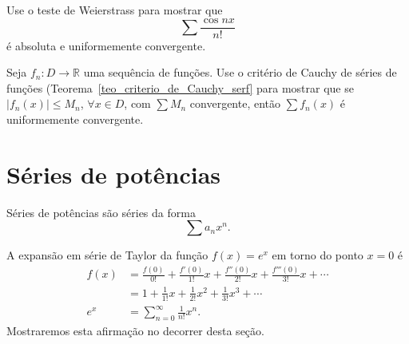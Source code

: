 \begin{exer}
  Use o teste de Weierstrass para mostrar que
  \begin{equation}
    \sum \frac{\cos nx}{n!}
  \end{equation}
é absoluta e uniformemente convergente.
\end{exer}

\begin{exer}
  Seja $f_n:D\to\mathbb{R}$ uma sequência de funções. Use o critério de Cauchy de séries de funções (Teorema~\ref{teo_criterio_de_Cauchy_serf} para mostrar que se $|f_n(x)|\leq M_n$, $\forall x\in D$, com $\sum M_n$ convergente, então $\sum f_n(x)$ é uniformemente convergente.
\end{exer}

\section{Séries de potências}\label{cap_ssfuncoes_ser_pot}

Séries de potências são séries da forma
\begin{equation}
  \sum a_nx^n.
\end{equation}

\begin{ex}
  A expansão em série de Taylor da função $f(x)=e^x$ em torno do ponto $x=0$ é
  \begin{align}
    f(x) &= \frac{f(0)}{0!} + \frac{f'(0)}{1!}x + \frac{f''(0)}{2!}x + \frac{f'''(0)}{3!}x + \cdots\\
    &= 1 + \frac{1}{1!}x + \frac{1}{2!}x^2 + \frac{1}{3!}x^3 + \cdots\\
    e^{x} &= \sum_{n=0}^\infty \frac{1}{n!}x^n.
  \end{align}
Mostraremos esta afirmação no decorrer desta seção.
\end{ex}

